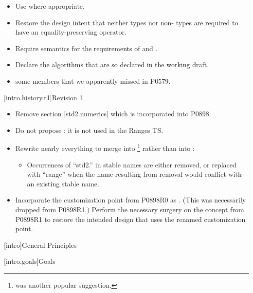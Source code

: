 \begin{itemize}
\item Use  where appropriate.

\item Restore the design intent that neither  types nor
  non-  types are required to have an
  equality-preserving \tcode{*} operator.

\item Require semantics for the  requirements of
   and
  .

\item Declare  the algorithms that are so declared in the
  working draft.

\item {} some  members that we apparently
  missed in P0579.
\end{itemize}

[intro.history.r1]{Revision 1}
\begin{itemize}
\item Remove section [std2.numerics] which is incorporated into P0898.

\item Do not propose : it is not used in the Ranges TS.

\item Rewrite nearly everything to merge into \footnote{
was another popular suggestion.} rather than into :
  \begin{itemize}
  \item Occurrences of ``std2.'' in stable names are either removed, or replaced with
    ``range'' when the name resulting from removal would conflict with an existing
    stable name.
  \end{itemize}

\item Incorporate the  customization point from P0898R0 as
. (This was necessarily dropped from P0898R1.) Perform the
necessary surgery on the  concept from P0898R1 to restore the
intended design that uses the renamed customization point.

\end{itemize}

[intro]{General Principles}

[intro.goals]{Goals}

